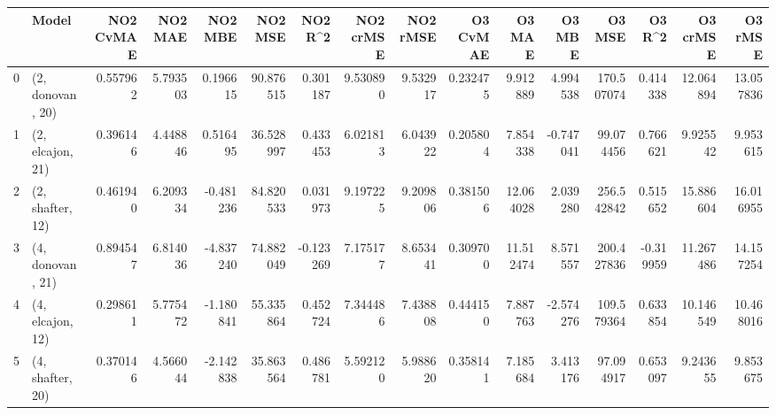 \begin{tabular}{llrrrrrrrrrrrrrr}
\toprule
{} &             Model &  NO2 CvMAE &   NO2 MAE &   NO2 MBE &    NO2 MSE &   NO2 R\textasciicircum2 &  NO2 crMSE &  NO2 rMSE &  O3 CvMAE &     O3 MAE &    O3 MBE &      O3 MSE &    O3 R\textasciicircum2 &   O3 crMSE &    O3 rMSE \\
\midrule
0 &  (2, donovan, 20) &   0.557962 &  5.793503 &  0.196615 &  90.876515 &  0.301187 &   9.530890 &  9.532917 &  0.232475 &   9.912889 &  4.994538 &  170.507074 &  0.414338 &  12.064894 &  13.057836 \\
1 &  (2, elcajon, 21) &   0.396146 &  4.448846 &  0.516495 &  36.528997 &  0.433453 &   6.021813 &  6.043922 &  0.205804 &   7.854338 & -0.747041 &   99.074456 &  0.766621 &   9.925542 &   9.953615 \\
2 &  (2, shafter, 12) &   0.461940 &  6.209334 & -0.481236 &  84.820533 &  0.031973 &   9.197225 &  9.209806 &  0.381506 &  12.064028 &  2.039280 &  256.542842 &  0.515652 &  15.886604 &  16.016955 \\
3 &  (4, donovan, 21) &   0.894547 &  6.814036 & -4.837240 &  74.882049 & -0.123269 &   7.175177 &  8.653441 &  0.309700 &  11.512474 &  8.571557 &  200.427836 & -0.319959 &  11.267486 &  14.157254 \\
4 &  (4, elcajon, 12) &   0.298611 &  5.775472 & -1.180841 &  55.335864 &  0.452724 &   7.344486 &  7.438808 &  0.444150 &   7.887763 & -2.574276 &  109.579364 &  0.633854 &  10.146549 &  10.468016 \\
5 &  (4, shafter, 20) &   0.370146 &  4.566044 & -2.142838 &  35.863564 &  0.486781 &   5.592120 &  5.988620 &  0.358141 &   7.185684 &  3.413176 &   97.094917 &  0.653097 &   9.243655 &   9.853675 \\
\bottomrule
\end{tabular}
